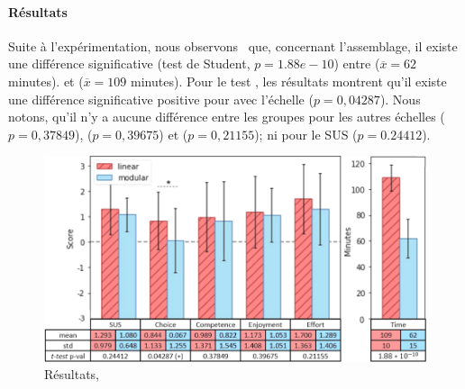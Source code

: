         \paragraph{Résultats}
            Suite à l'expérimentation, nous observons~ que, concernant l’assemblage, il existe une différence significative (test de Student, $p=1.88e-10$) entre  ($\overline{x}=62$ minutes). et  ($\overline{x}=109$ minutes). Pour le test , les résultats montrent qu'il existe une différence significative positive pour  avec l'échelle  ($p=0,04287$). Nous  notons, qu'il n’y a aucune différence entre les groupes pour les autres échelles   ($p=0,37849$),  ($p=0,39675$) et  ($p=0,21155$); ni pour le SUS ($p=0.24412$).
            \begin{figure}[!h]
                \centering
                \includegraphics[width=0.9\linewidth]{Figures/Gilliard-result}
                \caption{Résultats, }
                \label{fig:result_dragster}
            \end{figure}
